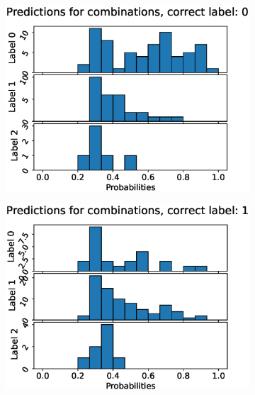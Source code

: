 \begin{figure}
  \centering
  \begin{subfigure}[t]{0.33\textwidth}
    \includegraphics[width=\textwidth]{files/figs/res/pelvis/pc0.eps}
    \caption{}
    \label{fig:pelvis-pc0}
  \end{subfigure}%
  \begin{subfigure}[t]{0.33\textwidth}
    \includegraphics[width=\textwidth]{files/figs/res/pelvis/pc1.eps}
    \caption{}
    \label{fig:pelvis-pc1}
  \end{subfigure}%
  \begin{subfigure}[t]{0.33\textwidth}

\end{subfigure}
\end{figure}
